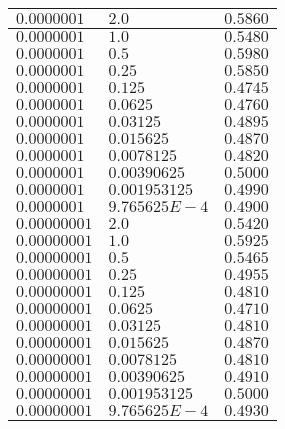 \begin{enumerate}
\begin{longtable}{| p{}  |  p{} |p{}  |}
      $0.0000001$ & $2.0$ & $0.5860$ \\
      \hline
      $0.0000001$ & $1.0$ & $0.5480$ \\
      \hline
      $0.0000001$ & $0.5$ & $0.5980$ \\
      \hline
      $0.0000001$ & $0.25$ & $0.5850$ \\
      \hline
      $0.0000001$ & $0.125$ & $0.4745$ \\
      \hline
      $0.0000001$ & $0.0625$ & $0.4760$ \\
      \hline
      $0.0000001$ & $0.03125$ & $0.4895$ \\
      \hline
      $0.0000001$ & $0.015625$ & $0.4870$ \\
      \hline
      $0.0000001$ & $0.0078125$ & $0.4820$ \\
      \hline
      $0.0000001$ & $0.00390625$ & $0.5000$ \\
      \hline
      $0.0000001$ & $0.001953125$ & $0.4990$ \\
      \hline
      $0.0000001$ & $9.765625E-4$ & $0.4900$ \\
      \hline
      
      $0.00000001$ & $2.0$ & $0.5420$ \\
      \hline
      $0.00000001$ & $1.0$ & $0.5925$ \\
      \hline
      $0.00000001$ & $0.5$ & $0.5465$ \\
      \hline
      $0.00000001$ & $0.25$ & $0.4955$ \\
      \hline
      $0.00000001$ & $0.125$ & $0.4810$ \\
      \hline
      $0.00000001$ & $0.0625$ & $0.4710$ \\
      \hline
      $0.00000001$ & $0.03125$ & $0.4810$ \\
      \hline
      $0.00000001$ & $0.015625$ & $0.4870$ \\
      \hline
      $0.00000001$ & $0.0078125$ & $0.4810$ \\
      \hline
      $0.00000001$ & $0.00390625$ & $0.4910$ \\
      \hline
      $0.00000001$ & $0.001953125$ & $0.5000$ \\
      \hline
      $0.00000001$ & $9.765625E-4$ & $0.4930$ \\
      \hline    
      

\end{longtable}
\end{enumerate}
